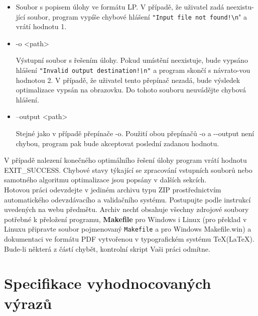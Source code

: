 \documentclass[
12pt,
a4paper,
pdftex,
czech,
titlepage
]{report}
\begin{document}
\begin{itemize}[label={}]
\item <input-file>
\hspace{1.5cm} \begin{minipage}[t]{0.6\textwidth}  Soubor s popisem úlohy ve formátu LP.
V případě, že uživatel zadá neexistu- jící soubor, program vypíše
chybové hlášení \texttt{"Input file not found!{\textbackslash{}}n}" a vrátí
hodnotu 1.
\end{minipage}

\item -o <path>
\hspace{1.8cm} \begin{minipage}[t]{0.6\textwidth} Výstupní soubor s řešením úlohy. Pokud
umístění neexistuje, bude vypsáno hlášení \texttt{"Invalid output
destination!\emph{\textbackslash{}}n"} a program skončí s návrato-vou
hodnotou 2. V případě, že uživatel tento přepínač nezadá, bude výsledek
optimalizace vypsán na obrazovku. Do tohoto souboru neuvádějte chybová
hlášení.
\end{minipage}

\item --output <path>
\hspace{0.7cm} \begin{minipage}[t]{0.6\textwidth} Stejné jako v případě přepínače
-o. Použití obou přepínačů -o a -\/-output není chybou, program pak bude
akceptovat poslední zadanou hodnotu.
\end{minipage}
\end{itemize}

V případě nalezení konečného optimálního řešení úlohy program vrátí
hodnotu EXIT\_SUCCESS. Chybové stavy týkající se zpracování vstupních
souborů nebo samotného algoritmu optimalizace jsou popsány v dalších
sekcích.
\\

Hotovou práci odevzdejte v jediném archivu typu ZIP prostřednictvím automatického odevzdávacího a validačního systému. Postupujte podle instrukcí uvedených na webu předmětu. Archiv nechť
obsahuje všechny zdrojové soubory potřebné k přeložení programu, \textbf{Makefile} pro Windows i Linux
(pro překlad v Linuxu připravte soubor pojmenovaný \texttt{Makefile} a pro Windows Makefile.win)
a dokumentaci ve formátu PDF vytvořenou v typografickém systému \TeX (\LaTeX). Bude-li některá
z částí chybět, kontrolní skript Vaši práci odmítne.

\section*{Specifikace vyhodnocovaných výrazů
}
\end{document}

